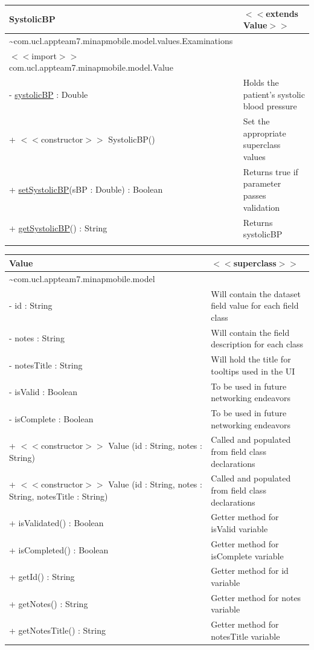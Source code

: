 \documentclass[12pt,a4paper,oneside,titlepage]{article}
\begin{document}
\begin{center}
	\begin{tabular}{| p{13cm} | p{5cm} |}
	\hline
	\textbf{SystolicBP} & \textbf{$<<$extends Value$>>$} \\ \hline
	\textasciitilde com.ucl.appteam7.minapmobile.model.values.Examinations	 &  \\ \hline
$<<$import$>>$ com.ucl.appteam7.minapmobile.model.Value	 &  \\ \hline \hline
- \underline{systolicBP} : Double	 & Holds the patient's systolic blood pressure \\ \hline \hline
+ $<<$constructor$>>$ SystolicBP()	 & Set the appropriate superclass values \\ \hline
+ \underline{setSystolicBP}(sBP : Double) : Boolean	 & Returns true if parameter passes validation \\ \hline
+ \underline{getSystolicBP}() : String	 & Returns systolicBP \\&\\ \hline
	\end{tabular}
\end{center}

\begin{center}
	\begin{tabular}{| p{13cm} | p{5cm} |}
	\hline
	\textbf{Value} & \textbf{$<<$superclass$>>$} \\ \hline
	\textasciitilde com.ucl.appteam7.minapmobile.model	  & \\ \hline \hline
- id : String	 & Will contain the dataset field value for each field class \\ \hline
- notes : String	 & Will contain the field description for each class \\ \hline
- notesTitle : String	 & Will hold the title for tooltips used in the UI \\ \hline
- isValid : Boolean	 & To be used in future networking endeavors \\ \hline
- isComplete : Boolean	 & To be used in future networking endeavors \\ \hline \hline
+ $<<$constructor$>>$ Value (id : String, notes : String)	 & Called and populated from field class declarations \\ \hline
+ $<<$constructor$>>$ Value (id : String, notes : String, notesTitle : String)	 & Called and populated from field class declarations \\ \hline
+ isValidated() : Boolean	 & Getter method for isValid variable \\ \hline
+ isCompleted() : Boolean	 & Getter method for isComplete variable \\ \hline
+ getId() : String	 & Getter method for id variable \\ \hline
+ getNotes() : String	 & Getter method for notes variable \\ \hline
+ getNotesTitle() : String	 & Getter method for notesTitle variable \\ \hline
	\end{tabular}
\end{center}
\end{document}

